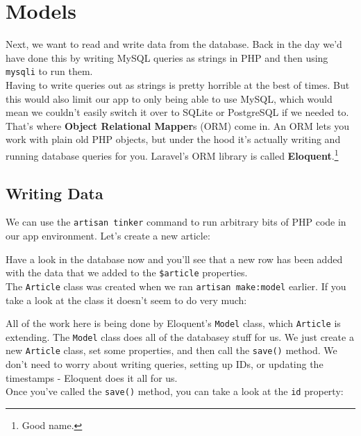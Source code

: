 \section{Models}

Next, we want to read and write data from the database. Back in the day we'd have done this by writing MySQL queries as strings in PHP and then using \texttt{mysqli} to run them.
\\

Having to write queries out as strings is pretty horrible at the best of times. But this would also limit our app to only being able to use MySQL, which would mean we couldn't easily switch it over to SQLite or PostgreSQL if we needed to.
\\

That's where \textbf{Object Relational Mapper}s (ORM) come in. An ORM lets you work with plain old PHP objects, but under the hood it's actually writing and running database queries for you. Laravel's ORM library is called \textbf{Eloquent}.\footnote{Good name.}


\subsection{Writing Data}

We can use the \texttt{artisan tinker} command to run arbitrary bits of PHP code in our app environment. Let's create a new article:


Have a look in the database now and you'll see that a new row has been added with the data that we added to the \texttt{\$article} properties.
\\

The \texttt{Article} class was created when we ran \texttt{artisan make:model} earlier. If you take a look at the class it doesn't seem to do very much:


All of the work here is being done by Eloquent's \texttt{Model} class, which \texttt{Article} is extending. The \texttt{Model} class does all of the databasey stuff for us. We just create a new \texttt{Article} class, set some properties, and then call the \texttt{save()} method. We don't need to worry about writing queries, setting up IDs, or updating the timestamps - Eloquent does it all for us.
\\

Once you've called the \texttt{save()} method, you can take a look at the \texttt{id} property:

